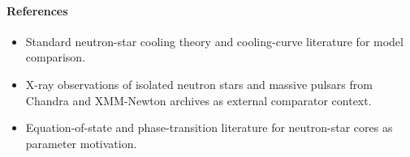 \documentclass[11pt]{article}
\begin{document}
\paragraph{References}
\begin{itemize}\raggedright
\item Standard neutron-star cooling theory and cooling-curve literature for model comparison.
\item X-ray observations of isolated neutron stars and massive pulsars from Chandra and XMM-Newton archives as external comparator context.
\item Equation-of-state and phase-transition literature for neutron-star cores as parameter motivation.
\end{itemize}
\end{document}
